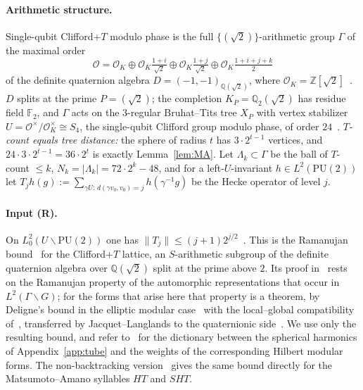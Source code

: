 \documentclass[aps,prx,twocolumn,superscriptaddress,nofootinbib,longbibliography]{revtex4-2}
\theoremstyle{plain}
\theoremstyle{definition}
\theoremstyle{remark}
\newcommand{\Z}{\mathbb{Z}}
\newcommand{\Q}{\mathbb{Q}}
\newcommand{\F}{\mathbb{F}}
\newcommand{\PU}{\mathrm{PU}(2)}
\begin{document}
\paragraph{Arithmetic structure.} Single-qubit Clifford+$T$ modulo phase is the full $\{(\sqrt2)\}$-arithmetic group $\Gamma$ of the maximal order
\begin{equation}
\mathcal O=\mathcal O_K\oplus\mathcal O_K\tfrac{1+i}{\sqrt2}\oplus\mathcal O_K\tfrac{1+j}{\sqrt2}\oplus\mathcal O_K\tfrac{1+i+j+k}{2}\label{eq:order}
\end{equation}
of the definite quaternion algebra $D=(-1,-1)_{\Q(\sqrt2)}$, where $\mathcal O_K=\Z[\sqrt2]$~\cite{KMM13,PS18}. $D$ splits at the prime $P=(\sqrt2)$; the completion $K_P=\Q_2(\sqrt2)$ has residue field $\F_2$, and $\Gamma$ acts on the $3$-regular Bruhat--Tits tree $X_P$ with vertex stabilizer $U=\mathcal O^\times/\mathcal O_K^\times\cong S_4$, the single-qubit Clifford group modulo phase, of order $24$~\cite[\S4.1.3]{PS18}. \emph{$T$-count equals tree distance:} the sphere of radius $t$ has $3\cdot2^{t-1}$ vertices, and $24\cdot3\cdot2^{t-1}=36\cdot2^t$ is exactly Lemma~\ref{lem:MA}. Let $\Lambda_k\subset\Gamma$ be the ball of $T$-count $\le k$, $N_k=|\Lambda_k|=72\cdot2^k-48$, and for a left-$U$-invariant $h\in L^2(\PU)$ let $T_jh(g):=\sum_{\gamma U:\,d(\gamma v_0,v_0)=j}h(\gamma^{-1}g)$ be the Hecke operator of level $j$.

\paragraph{Input (R).} On $L^2_0(U\backslash\PU)$ one has $\|T_j\|\le(j+1)2^{j/2}$~\cite[Eq.~(3.10)]{PS18}. This is the Ramanujan bound~\cite{LPS} for the Clifford+$T$ lattice, an $S$-arithmetic subgroup of the definite quaternion algebra over $\Q(\sqrt2)$ split at the prime above $2$. Its proof in~\cite{PS18} rests on the Ramanujan property of the automorphic representations that occur in $L^2(\Gamma\backslash G)$; for the forms that arise here that property is a theorem, by Deligne's bound in the elliptic modular case~\cite{Deligne} with the local--global compatibility of~\cite{HarrisTaylor}, transferred by Jacquet--Langlands to the quaternionic side~\cite{Blasius}. We use only the resulting bound, and refer to~\cite[Sec.~3]{PS18} for the dictionary between the spherical harmonics of Appendix~\ref{app:tube} and the weights of the corresponding Hilbert modular forms. The non-backtracking version~\cite[Eqs.~(5.2)--(5.3)]{PS18} gives the same bound directly for the Matsumoto--Amano syllables $HT$ and $SHT$.
\end{document}

